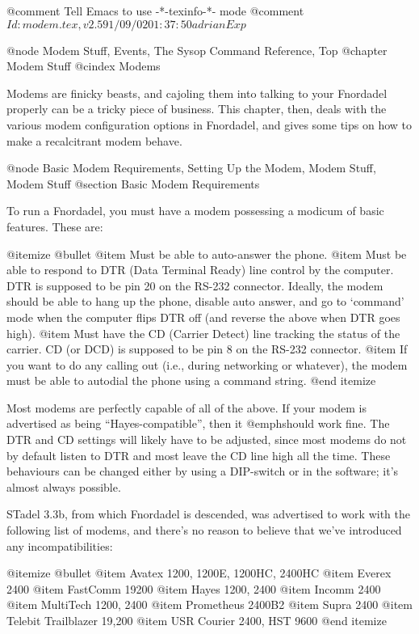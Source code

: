 @comment Tell Emacs to use -*-texinfo-*- mode
@comment $Id: modem.tex,v 2.5 91/09/02 01:37:50 adrian Exp $

@node Modem Stuff, Events, The Sysop Command Reference, Top
@chapter Modem Stuff
@cindex Modems

Modems are finicky beasts, and cajoling them into talking to your
Fnordadel properly can be a tricky piece of business.  This chapter, then,
deals with the various modem configuration options in Fnordadel, and
gives some tips on how to make a recalcitrant modem behave.

@node Basic Modem Requirements, Setting Up the Modem, Modem Stuff, Modem Stuff
@section Basic Modem Requirements

To run a Fnordadel, you must have a modem possessing a
modicum of basic features.  These are:

@itemize @bullet
@item
Must be able to auto-answer the phone.
@item
Must be able to respond to DTR (Data Terminal Ready)
line control by the computer.  DTR is supposed to be
pin 20 on the RS-232 connector.  Ideally, the modem
should be able to hang up the phone, disable auto
answer, and go to `command' mode when the computer flips
DTR off (and reverse the above when DTR goes high).
@item
Must have the CD (Carrier Detect) line tracking the
status of the carrier.  CD (or DCD) is supposed to be
pin 8 on the RS-232 connector.
@item
If you want to do any calling out (i.e., during networking
or whatever), the modem must be able to autodial the
phone using a command string.
@end itemize

Most modems are perfectly capable of all of the above.
If your modem is advertised as being ``Hayes-compatible'', then it
@emph{should} work fine.  The DTR and CD settings will likely have to
be adjusted, since most modems do not by default listen to DTR
and most leave the CD line high all the time.  These behaviours
can be changed either by using a DIP-switch or in the software;
it's almost always possible.

STadel 3.3b, from which Fnordadel is descended, was
advertised to work with the following list of modems, and there's
no reason to believe that we've introduced any incompatibilities:

@itemize @bullet
@item
Avatex 1200, 1200E, 1200HC, 2400HC	
@item
Everex 2400
@item
FastComm 19200
@item
Hayes 1200, 2400
@item
Incomm 2400
@item
MultiTech 1200, 2400
@item
Prometheus 2400B2
@item
Supra 2400
@item
Telebit Trailblazer 19,200
@item
USR Courier 2400, HST 9600
@end itemize

